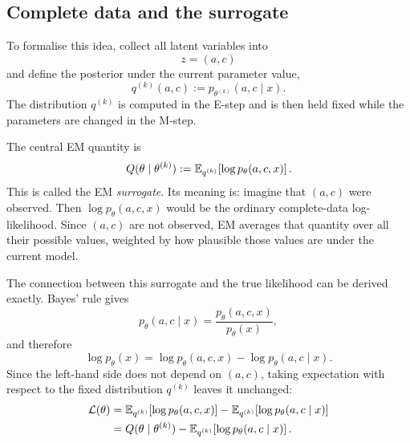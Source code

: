 \subsection{Complete data and the surrogate}

To formalise this idea, collect all latent variables into
\begin{equation}
  z=(a,c)
\end{equation}
and define the posterior under the current parameter value,
\begin{equation}
  q^{(k)}(a,c)
  :=
  p_{\theta^{(k)}}(a,c\mid x).
  \label{eq:em-q-def}
\end{equation}
The distribution $q^{(k)}$ is computed in the E-step and is then held fixed
while the parameters are changed in the M-step.

The central EM quantity is
\begin{equation}
  Q(\theta\mid\theta^{(k)})
  :=
  \mathbb{E}_{q^{(k)}}\!
  \left[
    \log p_\theta(a,c,x)
  \right].
  \label{eq:em-Q-def}
\end{equation}
This is called the EM \emph{surrogate}. Its meaning is: imagine that
$(a,c)$ were observed. Then $\log p_\theta(a,c,x)$ would be the ordinary
complete-data log-likelihood. Since $(a,c)$ are not observed, EM averages that
quantity over all their possible values, weighted by how plausible those
values are under the current model.

The connection between this surrogate and the true likelihood can be derived
exactly. Bayes' rule gives
\begin{equation}
  p_\theta(a,c\mid x)
  =
  \frac{p_\theta(a,c,x)}{p_\theta(x)},
\end{equation}
and therefore
\begin{equation}
  \log p_\theta(x)
  =
  \log p_\theta(a,c,x)
  -
  \log p_\theta(a,c\mid x).
  \label{eq:em-bayes-log}
\end{equation}
Since the left-hand side does not depend on $(a,c)$, taking expectation with
respect to the fixed distribution $q^{(k)}$ leaves it unchanged:
\begin{align}
  \mathcal L(\theta)
  &=
  \mathbb{E}_{q^{(k)}}\!
  \left[
    \log p_\theta(a,c,x)
  \right]
  -
  \mathbb{E}_{q^{(k)}}\!
  \left[
    \log p_\theta(a,c\mid x)
  \right]
  \nonumber\\
  &=
  Q(\theta\mid\theta^{(k)})
  -
  \mathbb{E}_{q^{(k)}}\!
  \left[
    \log p_\theta(a,c\mid x)
  \right].
  \label{eq:em-first-decomposition}
\end{align}

